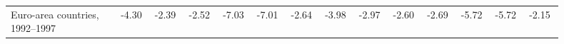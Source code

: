 \begin{table}[!htbp]
\begin{threeparttable}
\begin{tabular}{@{}>{\raggedright\arraybackslash}p{0.18\linewidth}*{13}{>{\centering\arraybackslash}p{0.055\linewidth}}@{}}
Euro-area countries, 1992--1997 & \makecell[c]{\rule{0pt}{2.6ex} -4.30 \\ \rule{0pt}{2.0ex} \phantom{\textsuperscript{***}}} & \makecell[c]{\rule{0pt}{2.6ex} -2.39 \\ \rule{0pt}{2.0ex} \phantom{\textsuperscript{***}}} & \makecell[c]{\rule{0pt}{2.6ex} -2.52 \\ \rule{0pt}{2.0ex} \phantom{\textsuperscript{***}}} & \makecell[c]{\rule{0pt}{2.6ex} -7.03 \\ \rule{0pt}{2.0ex} \phantom{\textsuperscript{***}}} & \makecell[c]{\rule{0pt}{2.6ex} -7.01 \\ \rule{0pt}{2.0ex} \phantom{\textsuperscript{***}}} & \makecell[c]{\rule{0pt}{2.6ex} -2.64 \\ \rule{0pt}{2.0ex} \phantom{\textsuperscript{***}}} & \makecell[c]{\rule{0pt}{2.6ex} -3.98 \\ \rule{0pt}{2.0ex} \phantom{\textsuperscript{***}}} & \makecell[c]{\rule{0pt}{2.6ex} -2.97 \\ \rule{0pt}{2.0ex} \phantom{\textsuperscript{***}}} & \makecell[c]{\rule{0pt}{2.6ex} -2.60 \\ \rule{0pt}{2.0ex} \phantom{\textsuperscript{***}}} & \makecell[c]{\rule{0pt}{2.6ex} -2.69 \\ \rule{0pt}{2.0ex} \phantom{\textsuperscript{***}}} & \makecell[c]{\rule{0pt}{2.6ex} -5.72 \\ \rule{0pt}{2.0ex} \phantom{\textsuperscript{***}}} & \makecell[c]{\rule{0pt}{2.6ex} -5.72 \\ \rule{0pt}{2.0ex} \phantom{\textsuperscript{***}}} & \makecell[c]{\rule{0pt}{2.6ex} -2.15 \\ \rule{0pt}{2.0ex} \phantom{\textsuperscript{***}}} \\

\end{tabular}
\end{threeparttable}
\end{table}
